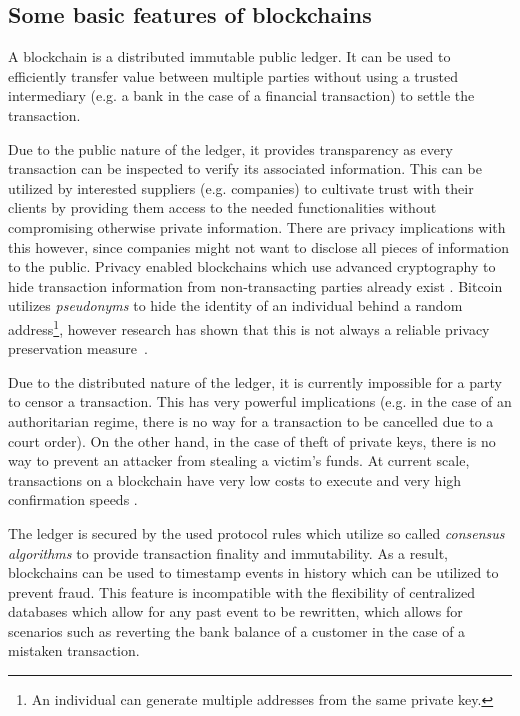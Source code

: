 \subsection{Some basic features of blockchains} \label{advantages}
A blockchain is a distributed immutable public ledger. It can be used to efficiently transfer value between multiple parties without using a trusted intermediary (e.g. a bank in the case of a financial transaction) to settle the transaction. 

Due to the public nature of the ledger, it provides transparency as every transaction can be inspected to verify its associated information. This can be utilized by interested suppliers (e.g. companies) to cultivate trust with their clients by providing them access to the needed functionalities without compromising otherwise private information. There are privacy implications with this however, since companies might not want to disclose all pieces of information to the public. Privacy enabled blockchains which use advanced cryptography to hide transaction information from non-transacting parties already exist \cite{monero, zcash, pivx} . Bitcoin utilizes \textit{pseudonyms} to hide the identity of an individual behind a random address\footnote{An individual can generate multiple addresses from the same private key.}, however research has shown that this is not always a reliable privacy preservation measure~\cite{journals/corr/abs-1107-4524, DBLP:journals/corr/abs-1708-04748}.

Due to the distributed nature of the ledger, it is currently impossible for a party to censor a transaction. This has very powerful implications (e.g. in the case of an authoritarian regime, there is no way for a transaction to be cancelled due to a court order). On the other hand, in the case of theft of private keys, there is no way to prevent an attacker from stealing a victim's funds.  At current scale, transactions on a blockchain have very low costs to execute and very high confirmation speeds \cite{ethpricestats}.

The ledger is secured by the used protocol rules which utilize so called \textit{consensus algorithms}\cite{consensus_algo} to provide transaction finality and immutability. As a result, blockchains can be used to timestamp events in history \cite{ots} which can be utilized to prevent fraud. This feature is incompatible with the flexibility of centralized databases which allow for any past event to be rewritten, which allows for scenarios such as reverting the bank balance of a customer in the case of a mistaken transaction. 

